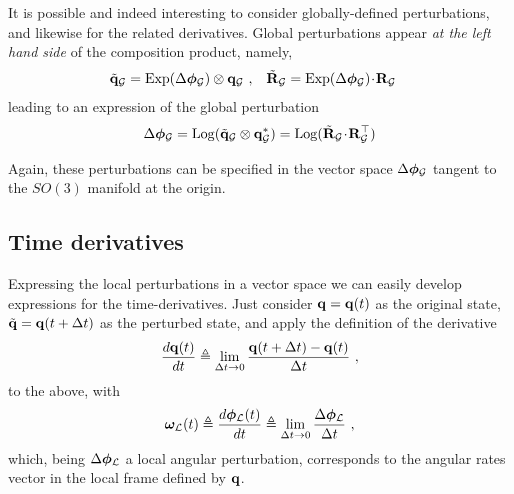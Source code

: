 It is possible and indeed interesting to consider globally-defined perturbations, and likewise for the related derivatives. 
Global perturbations appear \emph{at the left hand side} of the composition product, namely,
%
%
\begin{align}
\tilde{{\bf q}}_{\mathcal{G}} &= \operatorname*{Exp}(\Delta{\bm \phi}_{\mathcal{G}})\otimes{\bf q}_{\mathcal{G}}
~,& 
\tilde{{\bf R}}_{\mathcal{G}} &= \operatorname*{Exp}(\Delta{\bm \phi}_{\mathcal{G}})\!\cdot\!{\bf R}_{\mathcal{G}}
\end{align}
%
leading to an expression of the global perturbation 
%
\begin{align}
\Delta{\bm \phi}_{\mathcal{G}} = \operatorname*{Log}(\tilde{{\bf q}}_{\mathcal{G}}\otimes{\bf q}_{\mathcal{G}}^*) = \operatorname*{Log}(\tilde{{\bf R}}_{\mathcal{G}}\!\cdot\!{\bf R}_{\mathcal{G}}^{\top})
\end{align}


Again, these perturbations can be specified in the vector space $\Delta{\bm \phi}_{\mathcal{G}}$ tangent to the $SO(3)$ manifold at the origin.

\subsection{Time derivatives}

Expressing the local perturbations in a vector space we can easily develop expressions for the time-derivatives. 
Just consider ${\bf q}={\bf q}(t)$ as the original state, $\tilde{{\bf q}}={\bf q}(t+\Delta t)$ as the perturbed state, and apply the definition of the derivative
%
\begin{align}
\frac{d{\bf q}(t)}{dt} \triangleq \lim_{\Delta t\to0} \frac{{\bf q}(t+\Delta t)-{\bf q}(t)}{\Delta t}~, \label{equ:derivative}
\end{align}%
%
to the above, with
%
\begin{align}
{\bm \omega}_{\mathcal{L}}(t) \triangleq \frac{d{\bm \phi}_{\mathcal{L}}(t)}{dt} \triangleq \lim_{\Delta t\to0} \frac{\Delta{\bm \phi}_{\mathcal{L}}}{\Delta t}~,
\end{align}%
%
which, being $\Delta{\bm \phi}_{\mathcal{L}}$ a local angular perturbation, corresponds to the angular rates vector in the local frame defined by ${\bf q}$.

